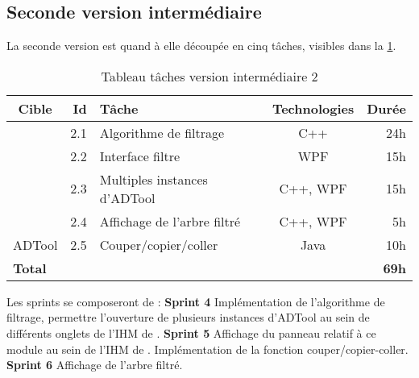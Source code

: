 	\subsection{Seconde version intermédiaire}
		La seconde version est quand à elle découpée en cinq tâches, visibles dans la \ttable{} \ref{tab:taches_units_2}.
		\begin{table}[h]
			\centering
			\begin{tabular}{|c|r|l|c|r|}
				\hline
				\textbf{Cible} & \textbf{Id} & \textbf{Tâche} & \textbf{Technologies} & \textbf{Durée}\\
				\hline

				\multirow{4}{*}{\glasir{}} & 2.1 & Algorithme de filtrage & C++ & 24h\\
				\cline{2-5}
				 & 2.2 & Interface filtre & WPF & 15h\\
				\cline{2-5}
				 & 2.3 & Multiples instances d'ADTool & C++, WPF & 15h\\
				\cline{2-5}
				 & 2.4 & Affichage de l'arbre filtré & C++, WPF & 5h\\
				\hline

				\multirow{1}{*}{ADTool} & 2.5 & Couper/copier/coller & \multirow{1}{*}{Java} & 10h\\
				\hline

				\multicolumn{4}{|l|}{\bf Total} & {\bf 69h}\\
				\hline
			\end{tabular}
			\caption{Tableau tâches version intermédiaire 2}
			\label{tab:taches_units_2}
		\end{table}
		\newline Les sprints se composeront de :\newline
		\textbf{Sprint 4} Implémentation de l'algorithme de filtrage, permettre l'ouverture de plusieurs instances d'ADTool au sein de différents onglets de l'IHM de \glasir{}.\newline 
		\textbf{Sprint 5} Affichage du panneau relatif à ce module au sein de l'IHM de \glasir{}. Implémentation de la fonction couper/copier-coller.\newline %
		\textbf{Sprint 6} Affichage de l'arbre filtré.

